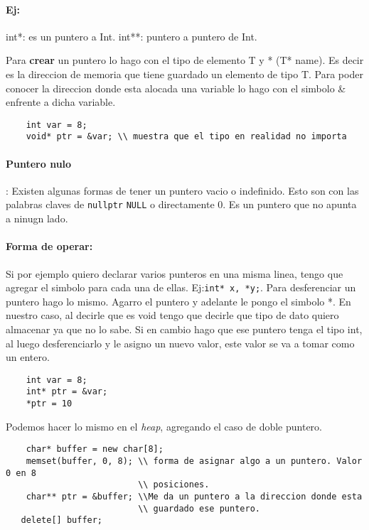 \documentclass[11pt]{article}
\begin{document}
\paragraph{Ej:} int*: es un puntero a Int.
int**: puntero a puntero de Int.
\vspace{.5cm}

Para \textbf{crear} un puntero lo hago con el tipo de elemento T y * (T* name).
Es decir es la direccion de memoria que tiene guardado un elemento de tipo T.
Para poder conocer la direccion donde esta alocada una variable lo hago con el simbolo
\& enfrente a dicha variable.
\begin{lstlisting}
    int var = 8;
    void* ptr = &var; \\ muestra que el tipo en realidad no importa
\end{lstlisting}
\paragraph{Puntero nulo}: Existen algunas formas de tener un puntero vacio o indefinido.
Esto son con las palabras claves de \texttt{nullptr} \texttt{NULL} o directamente 0.
Es un puntero que no apunta a ninugn lado.


\paragraph{Forma de operar:}



Si por ejemplo quiero declarar varios punteros en una misma linea,
tengo que agregar el simbolo para cada una de ellas.
Ej:\texttt{int* x, *y;}.
Para desferenciar un puntero hago lo mismo.
Agarro el puntero y adelante le pongo el simbolo *.
En nuestro caso, al decirle que es void tengo que decirle que tipo de dato
quiero almacenar ya que no lo sabe.
Si en cambio hago que ese puntero tenga el tipo int, al luego desferenciarlo y
le asigno un nuevo valor, este valor se va a tomar como un entero.

\begin{lstlisting}
    int var = 8;
    int* ptr = &var;
    *ptr = 10
\end{lstlisting}

Podemos hacer lo mismo en el \textit{heap}, agregando el caso de doble puntero.
\begin{lstlisting}
    char* buffer = new char[8];
    memset(buffer, 0, 8); \\ forma de asignar algo a un puntero. Valor 0 en 8
                          \\ posiciones.
    char** ptr = &buffer; \\Me da un puntero a la direccion donde esta
                          \\ guardado ese puntero.
   delete[] buffer;
\end{lstlisting}
\end{document}
